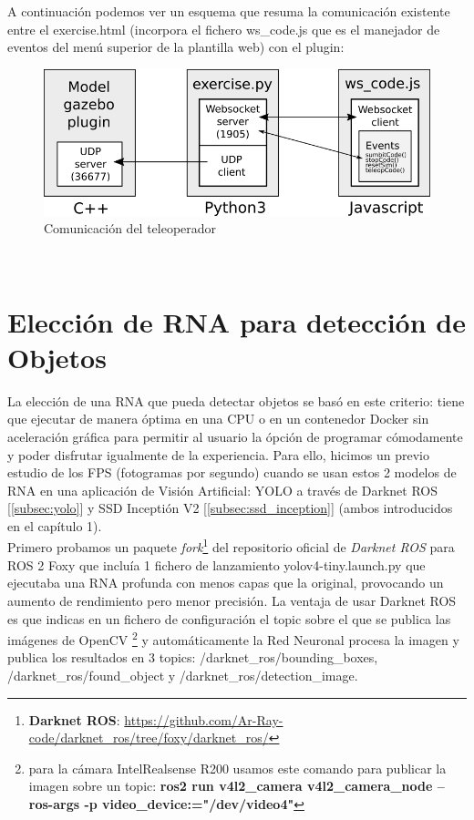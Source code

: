 A continuación podemos ver un esquema que resuma la comunicación existente entre el exercise.html (incorpora el fichero ws\_code.js que es el manejador de eventos del menú superior de la plantilla web) con el plugin:\\

\begin{figure} [H]
  \begin{center}
    \includegraphics[width=15cm]{imagenes/comunicacion-teleoperador.png}
  \end{center}
  \caption[Comunicación del teleoperador]{Comunicación del teleoperador}
  \label{fig:comunicacion_teleoperador}
\end{figure}\

\cleardoublepage




\section{Elección de RNA para detección de Objetos}
\label{sec:eleccion_rna}

La elección de una RNA que pueda detectar objetos se basó en este criterio: tiene que ejecutar de manera óptima en una CPU o en un contenedor Docker sin aceleración gráfica para permitir al usuario la ópción de programar cómodamente y poder disfrutar igualmente de la experiencia. Para ello, hicimos un previo estudio de los FPS (fotogramas por segundo) cuando se usan estos 2 modelos de RNA en una aplicación de Visión Artificial: YOLO a través de Darknet ROS [\ref{subsec:yolo}] y SSD Inceptión V2 [\ref{subsec:ssd_inception}] (ambos introducidos en el capítulo 1).\\

Primero probamos un paquete \textit{fork}\footnote{\textbf{Darknet ROS}: \url{https://github.com/Ar-Ray-code/darknet_ros/tree/foxy/darknet_ros/}} del repositorio oficial de \textit{Darknet ROS} para ROS 2 Foxy que incluía 1 fichero de lanzamiento yolov4-tiny.launch.py que ejecutaba una RNA profunda con menos capas que la original, provocando un aumento de rendimiento pero menor precisión. La ventaja de usar Darknet ROS es que indicas en un fichero de configuración el topic sobre el que se publica las imágenes de OpenCV \footnote{para la cámara IntelRealsense R200 usamos este comando para publicar la imagen sobre un topic: \textbf{ros2 run v4l2\_camera v4l2\_camera\_node --ros-args -p video\_device:="/dev/video4"}} y automáticamente la Red Neuronal procesa la imagen y publica los resultados en 3 topics: /darknet\_ros/bounding\_boxes, /darknet\_ros/found\_object y /darknet\_ros/detection\_image.\\

